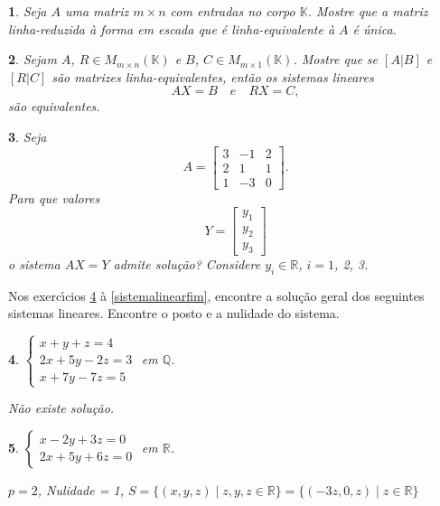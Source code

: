 \documentclass[12pt]{exam}
\newtheorem{exercicio}{}
\newcommand{\rac}{\mathbb{Q}}
\newcommand{\real}{\mathbb{R}}
\newcommand{\cp}[1]{\mathbb{#1}}
\begin{document}
\begin{exercicio}
  Seja $A$ uma matriz $m \times n$ com entradas no corpo $\cp{K}$. Mostre que a matriz linha-reduzida \`a forma em escada que \'e linha-equivalente \`a $A$ \'e \'unica.
\end{exercicio}

\begin{exercicio}
  Sejam $A$, $R \in M_{m \times n}(\cp{K})$ e $B$, $C \in M_{m \times 1}(\cp{K})$. Mostre que se $[A | B]$ e $[R | C]$ são matrizes linha-equivalentes, então os sistemas lineares
  \[
    AX = B \quad {e} \quad RX = C,
  \]
  são equivalentes.
\end{exercicio}

\begin{exercicio}
  Seja
  \[
    A = \begin{bmatrix}
      3 & -1 & 2\\
      2 & 1 & 1\\
      1 & -3 & 0
    \end{bmatrix}.
  \]
  Para que valores
  \[
    Y = \begin{bmatrix}
      y_1\\
      y_2\\
      y_3
    \end{bmatrix}
  \]
  o sistema $AX = Y$ admite solu\c{c}\~ao? Considere $y_i \in \real$, $i=1$, 2, 3.
\end{exercicio}

Nos exerc{\'\i}cios \ref{sistemalinearinicio} \`a \ref{sistemalinearfim}, encontre a solu\c{c}\~ao geral dos seguintes sistemas lineares. Encontre o posto e a nulidade do sistema.
\begin{exercicio}\label{sistemalinearinicio}
$\begin{cases}
  x + y + z = 4\\
  2x + 5y - 2z = 3\\
  x + 7y - 7z = 5
\end{cases}$ em $\rac$.
\begin{solucao}
  N\~ao existe solu\c{c}\~ao.
\end{solucao}
\end{exercicio}

\begin{exercicio}
$\begin{cases}
  x - 2y + 3z = 0\\
  2x + 5y + 6z = 0
\end{cases}$ em $\real$.
\begin{solucao}
  $p = 2$, Nulidade = 1, $S = \{(x, y, z) \mid z, y, z \in \real\} = \{(-3z, 0, z) \mid z \in \real\}$
\end{solucao}
\end{exercicio}
\end{document}
